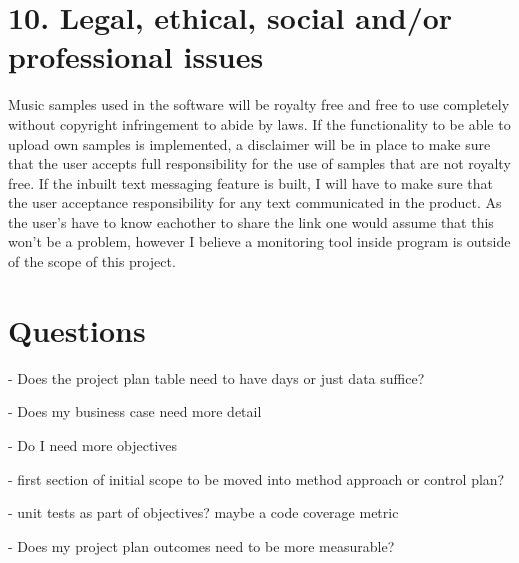 \documentclass[a4paper]{article}
\begin{document}
\section{10. Legal, ethical, social and/or professional issues}

Music samples used in the software will be royalty free and free to use completely without copyright infringement to abide by laws. If the functionality to be able to upload own samples is implemented, a disclaimer will be in place to make sure that the user accepts full responsibility for the use of samples that are not royalty free. If the inbuilt text messaging feature is built, I will have to make sure that the user acceptance responsibility for any text communicated in the product. As the user's have to know eachother to share the link one would assume that this won't be a problem, however I believe a monitoring tool inside program is outside of the scope of this project.

\section{Questions}

- Does the project plan table need to have days or just data suffice? \par
- Does my business case need more detail \par
- Do I need more objectives \par
- first section of initial scope to be moved into method approach or control plan? \par
- unit tests as part of objectives? maybe a code coverage metric \par
- Does my project plan outcomes need to be more measurable? \par
\end{document}
